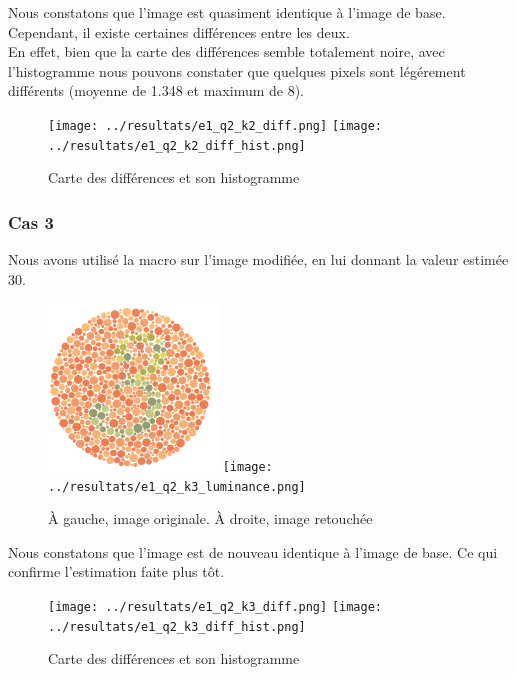 \documentclass[a4paper]{article}
\begin{document}
Nous constatons que l'image est quasiment identique à l'image de base. Cependant, il existe certaines différences entre les deux.\\
En effet, bien que la carte des différences semble totalement noire, avec l'histogramme nous pouvons constater que quelques pixels sont légérement différents (moyenne de 1.348 et maximum de 8).

\begin{figure}[H]
\begin{center}
\texttt{[image: ../resultats/e1\_q2\_k2\_diff.png]}
\texttt{[image: ../resultats/e1\_q2\_k2\_diff\_hist.png]}
\end{center}
\caption{Carte des différences et son histogramme}
\end{figure}

\clearpage
\subsubsection{Cas 3}
Nous avons utilisé la macro sur l'image modifiée, en lui donnant la valeur estimée 30.

\begin{figure}[H]
\begin{center}
\includegraphics[width=170px]{../base/cas_3_dalton3.png}
\texttt{[image: ../resultats/e1\_q2\_k3\_luminance.png]}
\end{center}
\caption{À gauche, image originale. À droite, image retouchée}
\end{figure}

Nous constatons que l'image est de nouveau identique à l'image de base. Ce qui confirme l'estimation faite plus tôt.

\begin{figure}[H]
\begin{center}
\texttt{[image: ../resultats/e1\_q2\_k3\_diff.png]}
\texttt{[image: ../resultats/e1\_q2\_k3\_diff\_hist.png]}
\end{center}
\caption{Carte des différences et son histogramme}
\end{figure}
\end{document}
